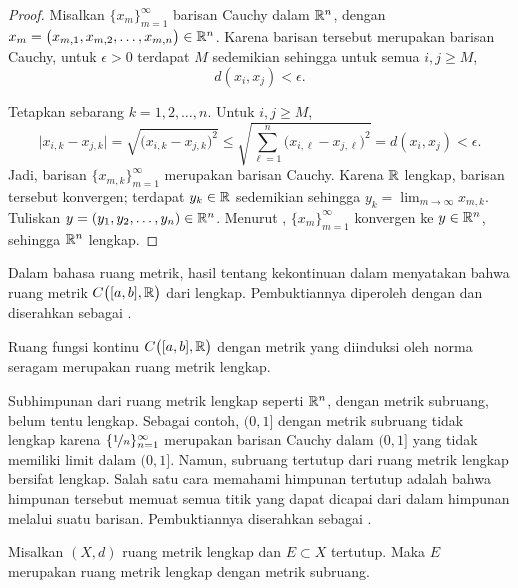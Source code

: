 \begin{proof}
Misalkan $\{ x_m \}_{m=1}^\infty$ barisan Cauchy
dalam ${\mathbb{R}}^n$, dengan $x_m = \bigl(x_{m,1},x_{m,2},\ldots,x_{m,n}\bigr) \in {\mathbb{R}}^n$.
Karena barisan tersebut merupakan barisan Cauchy, untuk $\epsilon > 0$ terdapat $M$ sedemikian sehingga untuk semua
$i,j \geq M$,
\begin{equation*}
d(x_i,x_j) < \epsilon.
\end{equation*}

Tetapkan sebarang $k=1,2,\ldots,n$.  Untuk $i,j \geq M$,
\begin{equation*}
\bigl\lvert x_{i,k} - x_{j,k} \bigr\rvert
=
\sqrt{{\bigl(x_{i,k} - x_{j,k}\bigr)}^2}
\leq
\sqrt{\sum_{\ell=1}^n {\bigl(x_{i,\ell}-x_{j,\ell}\bigr)}^2}
= d(x_i,x_j) < \epsilon .
\end{equation*}
Jadi, barisan $\{ x_{m,k} \}_{m=1}^\infty$ merupakan barisan Cauchy.  Karena ${\mathbb{R}}$
lengkap, barisan tersebut konvergen; terdapat $y_k \in {\mathbb{R}}$ sedemikian sehingga
$y_k = \lim_{m\to\infty} x_{m,k}$.
Tuliskan $y = (y_1,y_2,\ldots,y_n) \in {\mathbb{R}}^n$.
Menurut , $\{ x_m \}_{m=1}^\infty$ konvergen
ke $y \in {\mathbb{R}}^n$, sehingga ${\mathbb{R}}^n$ lengkap.
\end{proof}

Dalam bahasa ruang metrik,
hasil tentang kekontinuan dalam 
menyatakan bahwa ruang metrik
$C\bigl([a,b],{\mathbb{R}}\bigr)$ dari  lengkap.
Pembuktiannya diperoleh dengan  
dan diserahkan sebagai .

\begin{prop} \label{prop:CabRcomplete}
Ruang fungsi kontinu $C\bigl([a,b],{\mathbb{R}}\bigr)$ dengan metrik yang diinduksi oleh norma
seragam merupakan ruang metrik lengkap.
\end{prop}

Subhimpunan dari ruang metrik lengkap seperti ${\mathbb{R}}^n$, dengan metrik subruang, belum tentu
lengkap.  Sebagai contoh, $(0,1]$ dengan metrik subruang tidak
lengkap karena $\{ \nicefrac{1}{n} \}_{n=1}^\infty$ merupakan barisan Cauchy dalam $(0,1]$
yang tidak memiliki limit dalam $(0,1]$.
Namun, 
subruang tertutup dari ruang metrik lengkap bersifat
lengkap.  Salah satu cara
memahami himpunan tertutup adalah bahwa himpunan tersebut memuat semua titik yang
dapat dicapai dari dalam himpunan melalui suatu barisan.
Pembuktiannya diserahkan sebagai 
.

\begin{prop} \label{prop:closedcomplete}
Misalkan $(X,d)$ ruang metrik lengkap dan $E \subset X$
tertutup.
Maka $E$ merupakan ruang metrik lengkap dengan metrik subruang.
\end{prop}

